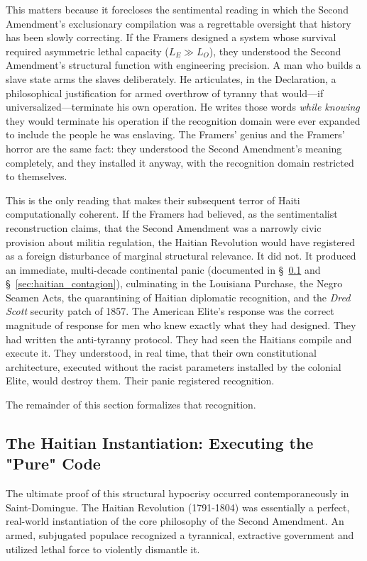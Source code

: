 This matters because it forecloses the sentimental reading in which the Second Amendment's exclusionary compilation was a regrettable oversight that history has been slowly correcting. If the Framers designed a system whose survival required asymmetric lethal capacity ($L_E \gg L_O$), they understood the Second Amendment's structural function with engineering precision. A man who builds a slave state arms the slaves deliberately. He articulates, in the Declaration, a philosophical justification for armed overthrow of tyranny that would---if universalized---terminate his own operation. He writes those words \textit{while knowing} they would terminate his operation if the recognition domain were ever expanded to include the people he was enslaving. The Framers' genius and the Framers' horror are the same fact: they understood the Second Amendment's meaning completely, and they installed it anyway, with the recognition domain restricted to themselves.

This is the only reading that makes their subsequent terror of Haiti computationally coherent. If the Framers had believed, as the sentimentalist reconstruction claims, that the Second Amendment was a narrowly civic provision about militia regulation, the Haitian Revolution would have registered as a foreign disturbance of marginal structural relevance. It did not. It produced an immediate, multi-decade continental panic (documented in \S~\ref{sec:haitian_instantiation} and \S~\ref{sec:haitian_contagion}), culminating in the Louisiana Purchase, the Negro Seamen Acts, the quarantining of Haitian diplomatic recognition, and the \textit{Dred Scott} security patch of 1857. The American Elite's response was the correct magnitude of response for men who knew exactly what they had designed. They had written the anti-tyranny protocol. They had seen the Haitians compile and execute it. They understood, in real time, that their own constitutional architecture, executed without the racist parameters installed by the colonial Elite, would destroy them. Their panic registered recognition.

The remainder of this section formalizes that recognition.

\subsection{The Haitian Instantiation: Executing the "Pure" Code}
\label{sec:haitian_instantiation}
The ultimate proof of this structural hypocrisy occurred contemporaneously in Saint-Domingue. The Haitian Revolution (1791-1804) was essentially a perfect, real-world instantiation of the core philosophy of the Second Amendment. An armed, subjugated populace recognized a tyrannical, extractive government and utilized lethal force to violently dismantle it.

